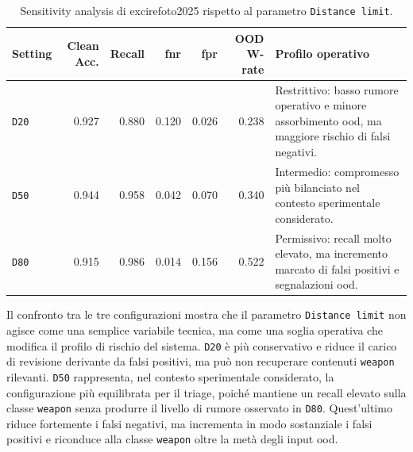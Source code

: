 \begin{table}[H]
\centering
\scriptsize
\renewcommand{\arraystretch}{1.15}
\setlength{\tabcolsep}{4pt}
\caption{Sensitivity analysis di \gls{excirefoto2025} rispetto al parametro \texttt{Distance limit}.}
\label{tab:results-excire-sensitivity}
\begin{tabularx}{0.95\textwidth}{@{}l r r r r r X@{}}
\toprule
\textbf{Setting} &
\textbf{Clean Acc.} &
\textbf{Recall} &
\textbf{\gls{fnr}} &
\textbf{\gls{fpr}} &
\textbf{OOD W-rate} &
\textbf{Profilo operativo} \\
\midrule

\texttt{D20} &
0.927 &
0.880 &
0.120 &
0.026 &
0.238 &
Restrittivo: basso rumore operativo e minore assorbimento \gls{ood}, ma maggiore rischio di falsi negativi. \\

\texttt{D50} &
0.944 &
0.958 &
0.042 &
0.070 &
0.340 &
Intermedio: compromesso più bilanciato nel contesto sperimentale considerato. \\

\texttt{D80} &
0.915 &
0.986 &
0.014 &
0.156 &
0.522 &
Permissivo: recall molto elevato, ma incremento marcato di falsi positivi e segnalazioni \gls{ood}. \\

\bottomrule
\end{tabularx}
\end{table}

Il confronto tra le tre configurazioni mostra che il parametro
\texttt{Distance limit} non agisce come una semplice variabile tecnica, ma come
una soglia operativa che modifica il profilo di rischio del sistema.
\texttt{D20} è più conservativo e riduce il carico di revisione derivante da
falsi positivi, ma può non recuperare contenuti \texttt{weapon} rilevanti.
\texttt{D50} rappresenta, nel contesto sperimentale considerato, la
configurazione più equilibrata per il triage, poiché mantiene un recall elevato
sulla classe \texttt{weapon} senza produrre il livello di rumore osservato in
\texttt{D80}. Quest'ultimo riduce fortemente i falsi negativi, ma incrementa in
modo sostanziale i falsi positivi e riconduce alla classe \texttt{weapon} oltre
la metà degli input \gls{ood}.

